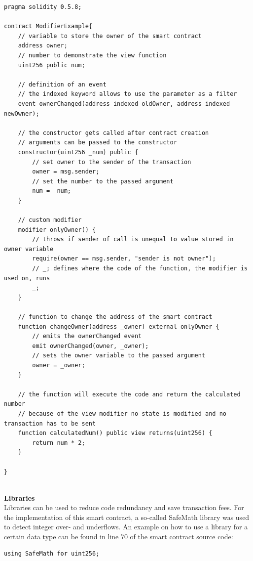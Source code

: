 \begin{lstlisting}[language=Solidity, caption={Basic structure of a smart contract}, label={lis:sc_basic_ref}]
pragma solidity 0.5.8;

contract ModifierExample{
    // variable to store the owner of the smart contract
    address owner;
    // number to demonstrate the view function
    uint256 public num;
    
    // definition of an event
    // the indexed keyword allows to use the parameter as a filter
    event ownerChanged(address indexed oldOwner, address indexed newOwner);
    
    // the constructor gets called after contract creation
    // arguments can be passed to the constructor
    constructor(uint256 _num) public {
        // set owner to the sender of the transaction
        owner = msg.sender;
        // set the number to the passed argument
        num = _num;
    }
    
    // custom modifier
    modifier onlyOwner() {
        // throws if sender of call is unequal to value stored in owner variable
        require(owner == msg.sender, "sender is not owner");
        // _; defines where the code of the function, the modifier is used on, runs
        _;
    }
    
    // function to change the address of the smart contract
    function changeOwner(address _owner) external onlyOwner {
        // emits the ownerChanged event
        emit ownerChanged(owner, _owner);
        // sets the owner variable to the passed argument
        owner = _owner;
    }
    
    // the function will execute the code and return the calculated number
    // because of the view modifier no state is modified and no transaction has to be sent
    function calculatedNum() public view returns(uint256) {
        return num * 2;
    }
    
}
\end{lstlisting}
\leavevmode
\\
\textbf{Libraries}\\
Libraries can be used to reduce code redundancy and save transaction fees.
For the implementation of this smart contract, a so-called SafeMath library was used to detect integer over- and underflows.
An example on how to use a library for a certain data type can be found in line 70 of the smart contract source code:
\\
\begin{lstlisting}[language=Solidity, caption={Using the SafeMath library}, label={lis:safemath_use}, firstnumber=70]
using SafeMath for uint256;
\end{lstlisting}
